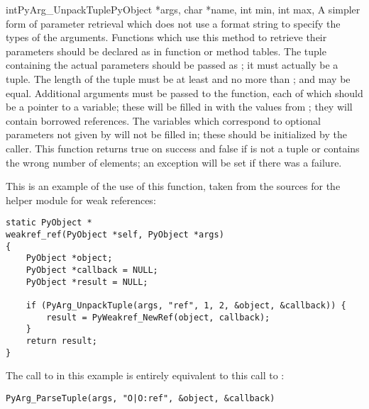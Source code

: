 \begin{cfuncdesc}{int}{PyArg_UnpackTuple}{PyObject *args, char *name,
                                          int min, int max, \moreargs}
  A simpler form of parameter retrieval which does not use a format
  string to specify the types of the arguments.  Functions which use
  this method to retrieve their parameters should be declared as
   in function or method tables.  The tuple
  containing the actual parameters should be passed as ; it
  must actually be a tuple.  The length of the tuple must be at least
   and no more than ;  and  may be
  equal.  Additional arguments must be passed to the function, each of
  which should be a pointer to a  variable; these
  will be filled in with the values from ; they will contain
  borrowed references.  The variables which correspond to optional
  parameters not given by  will not be filled in; these
  should be initialized by the caller.
  This function returns true on success and false if  is not
  a tuple or contains the wrong number of elements; an exception will
  be set if there was a failure.

  This is an example of the use of this function, taken from the
  sources for the  helper module for weak references:

\begin{verbatim}
static PyObject *
weakref_ref(PyObject *self, PyObject *args)
{
    PyObject *object;
    PyObject *callback = NULL;
    PyObject *result = NULL;

    if (PyArg_UnpackTuple(args, "ref", 1, 2, &object, &callback)) {
        result = PyWeakref_NewRef(object, callback);
    }
    return result;
}
\end{verbatim}

  The call to  in this example is
  entirely equivalent to this call to :

\begin{verbatim}
PyArg_ParseTuple(args, "O|O:ref", &object, &callback)
\end{verbatim}

\end{cfuncdesc}

